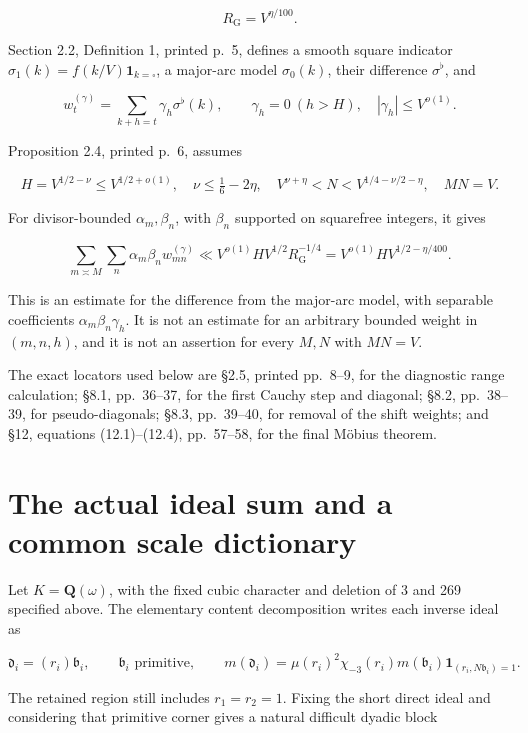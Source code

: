 \[
R_{\mathrm G}=V^{\eta/100}.
\]

Section 2.2, Definition 1, printed p.~5, defines a smooth square
indicator \(\sigma_1(k)=f(k/V)\mathbf1_{k=\square}\), a major-arc model
\(\sigma_0(k)\), their difference \(\sigma^\flat\), and

\[
w_t^{(\gamma)}=\sum_{k+h=t}\gamma_h\sigma^\flat(k),
\qquad \gamma_h=0\ (h>H),\quad |\gamma_h|\le V^{o(1)}.
\tag{2}
\]

Proposition 2.4, printed p.~6, assumes

\[
H=V^{1/2-\nu}\le V^{1/2+o(1)},\quad
\nu\le\tfrac16-2\eta,\quad
V^{\nu+\eta}<N<V^{1/4-\nu/2-\eta},\quad MN=V.
\tag{3}
\]

For divisor-bounded \(\alpha_m,\beta_n\), with \(\beta_n\) supported on
squarefree integers, it gives

\[
\sum_{m\asymp M}\sum_n\alpha_m\beta_n w_{mn}^{(\gamma)}
\ll V^{o(1)}HV^{1/2}R_{\mathrm G}^{-1/4}
=V^{o(1)}HV^{1/2-\eta/400}.
\tag{4}
\]

This is an estimate for the difference from the major-arc model, with
separable coefficients \(\alpha_m\beta_n\gamma_h\). It is not an
estimate for an arbitrary bounded weight in \((m,n,h)\), and it is not
an assertion for every \(M,N\) with \(MN=V\).

The exact locators used below are §2.5, printed pp.~8--9, for the
diagnostic range calculation; §8.1, pp.~36--37, for the first Cauchy
step and diagonal; §8.2, pp.~38--39, for pseudo-diagonals; §8.3,
pp.~39--40, for removal of the shift weights; and §12, equations
(12.1)--(12.4), pp.~57--58, for the final Möbius theorem.

\section{The actual ideal sum and a common scale
dictionary}\label{the-actual-ideal-sum-and-a-common-scale-dictionary}

Let \(K=\mathbf Q(\omega)\), with the fixed cubic character and deletion
of 3 and 269 specified above. The elementary content decomposition
writes each inverse ideal as

\[
\mathfrak d_i=(r_i)\mathfrak b_i,
\qquad \mathfrak b_i\text{ primitive},
\qquad m(\mathfrak d_i)=\mu(r_i)^2\chi_{-3}(r_i)
m(\mathfrak b_i)\mathbf1_{(r_i,N\mathfrak b_i)=1}.
\]

The retained region still includes \(r_1=r_2=1\). Fixing the short
direct ideal and considering that primitive corner gives a natural
difficult dyadic block

